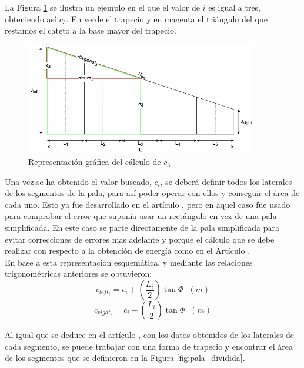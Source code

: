 La Figura \ref{fig:sacar_c3} se ilustra un ejemplo en el que  el valor de $i$ es igual a tres, obteniendo así $c_3$. En verde el trapecio y en magenta el triángulo del que restamos el cateto a la base mayor del trapecio.\\

\begin{figure}[H]
    \centering
    \includegraphics[width=0.9\textwidth]{images/Trapecio calculo x.png}
    \caption{Representación gráfica del cálculo de $c_3$} 
    \label{fig:sacar_c3}
\end{figure}


Una vez se ha obtenido el valor buscado, $c_i$, se deberá definir todos los laterales de los segmentos de la pala, para así poder operar con ellos y conseguir el área de cada uno. Esto ya fue desarrollado en el artículo \cite{armenta2021predictive}, pero en aquel caso fue usado para comprobar el error que suponía usar un rectángulo en vez de una pala simplificada. En este caso se parte directamente de la pala simplificada para evitar correcciones de errores mas adelante y porque el cálculo que se debe realizar con respecto a la obtención de energía como en el Artículo \cite{armenta2021predictive}.\\

En base a esta representación esquemática, y mediante las relaciones trigonométricas anteriores se obtuvieron:
\begin{equation}
 c_{left_i} = c_i + (\dfrac{L_i}{2}) \tan \varPhi \hspace{7pt} (m)
 \label{def:laterales_segmento_left}
\end{equation}
\begin{equation}
 c_{right_i} = c_i - (\dfrac{L_i}{2}) \tan \varPhi \hspace{7pt} (m)
\label{def:laterales_segmento_right}
\end{equation}

Al igual que se deduce en el artículo \cite{armenta2021predictive}, con los datos obtenidos de los laterales de cada segmento, se puede trabajar con una forma de trapecio y encontrar el área de los segmentos que se definieron en la Figura \ref{fig:pala_dividida}.\\

